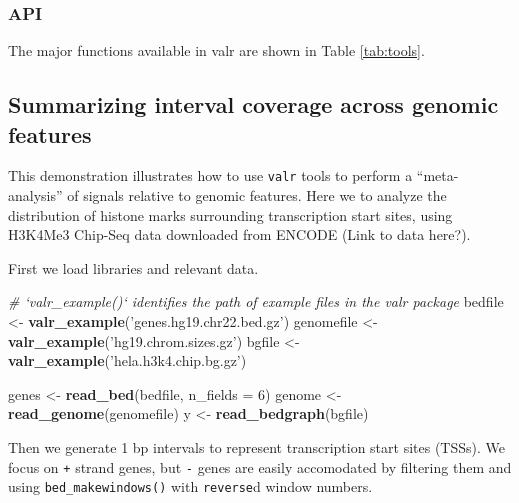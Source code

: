 \documentclass[9pt,a4paper]{extarticle}
\renewcommand{\KeywordTok}[1]{\textbf{{#1}}}
\renewcommand{\DataTypeTok}[1]{\textcolor[rgb]{0.50,0.00,0.00}{{#1}}}
\renewcommand{\DecValTok}[1]{\textcolor[rgb]{0.00,0.00,1.00}{{#1}}}
\renewcommand{\StringTok}[1]{\textcolor[rgb]{0.87,0.00,0.00}{{#1}}}
\renewcommand{\CommentTok}[1]{\textcolor[rgb]{0.50,0.50,0.50}{\textit{{#1}}}}
\renewcommand{\NormalTok}[1]{{#1}}
\begin{document}
\subsubsection*{API}\label{api}
The major functions available in valr are shown in Table \ref{tab:tools}.


\subsection*{Summarizing interval coverage across genomic features}

This demonstration illustrates how to use \texttt{valr} tools to perform
a ``meta-analysis'' of signals relative to genomic features. Here we to
analyze the distribution of histone marks surrounding transcription
start sites, using H3K4Me3 Chip-Seq data downloaded from ENCODE (Link to data here?).

First we load libraries and relevant data.

\begin{Highlighting}[]
\CommentTok{# `valr_example()` identifies the path of example files in the valr package}
\NormalTok{bedfile <-}\StringTok{ }\KeywordTok{valr_example}\NormalTok{(}\StringTok{'genes.hg19.chr22.bed.gz'}\NormalTok{)}
\NormalTok{genomefile <-}\StringTok{ }\KeywordTok{valr_example}\NormalTok{(}\StringTok{'hg19.chrom.sizes.gz'}\NormalTok{)}
\NormalTok{bgfile  <-}\StringTok{ }\KeywordTok{valr_example}\NormalTok{(}\StringTok{'hela.h3k4.chip.bg.gz'}\NormalTok{)}

\NormalTok{genes <-}\StringTok{ }\KeywordTok{read_bed}\NormalTok{(bedfile, }\DataTypeTok{n_fields =} \DecValTok{6}\NormalTok{)}
\NormalTok{genome <-}\StringTok{ }\KeywordTok{read_genome}\NormalTok{(genomefile)}
\NormalTok{y <-}\StringTok{ }\KeywordTok{read_bedgraph}\NormalTok{(bgfile)}
\end{Highlighting}

Then we generate 1 bp intervals to represent transcription start sites
(TSSs). We focus on \texttt{+} strand genes, but \texttt{-} genes are
easily accomodated by filtering them and using
\texttt{bed\_makewindows()} with \texttt{reverse}d window numbers.
\end{document}
